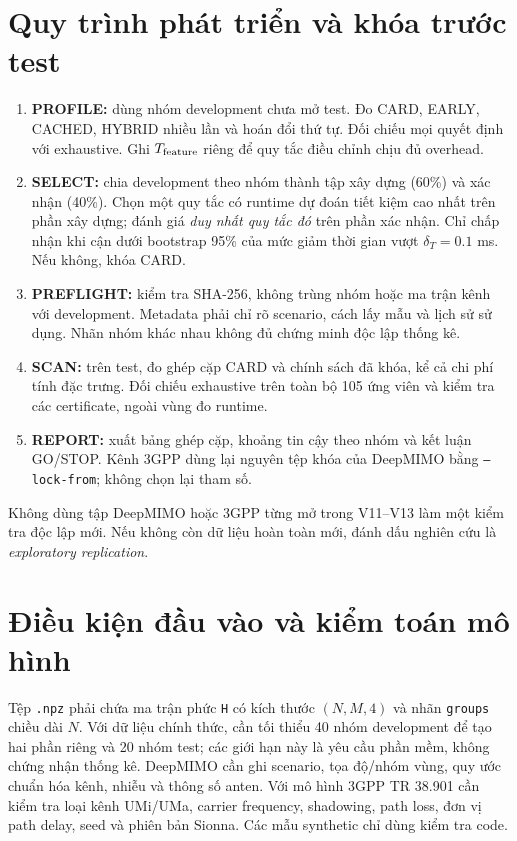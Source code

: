 \documentclass[11pt,onecolumn]{IEEEtran}
\begin{document}
\section{Quy trình phát triển và khóa trước test}
\begin{enumerate}
\item \textbf{PROFILE:} dùng nhóm development chưa mở test. Đo CARD, EARLY, CACHED, HYBRID nhiều lần và hoán đổi thứ tự. Đối chiếu mọi quyết định với exhaustive. Ghi $T_{\rm feature}$ riêng để quy tắc điều chỉnh chịu đủ overhead.
\item \textbf{SELECT:} chia development theo nhóm thành tập xây dựng (60\%) và xác nhận (40\%). Chọn một quy tắc có runtime dự đoán tiết kiệm cao nhất trên phần xây dựng; đánh giá \emph{duy nhất quy tắc đó} trên phần xác nhận. Chỉ chấp nhận khi cận dưới bootstrap 95\% của mức giảm thời gian vượt $\delta_T=0.1$ ms. Nếu không, khóa CARD.
\item \textbf{PREFLIGHT:} kiểm tra SHA-256, không trùng nhóm hoặc ma trận kênh với development. Metadata phải chỉ rõ scenario, cách lấy mẫu và lịch sử sử dụng. Nhãn nhóm khác nhau không đủ chứng minh độc lập thống kê.
\item \textbf{SCAN:} trên test, đo ghép cặp CARD và chính sách đã khóa, kể cả chi phí tính đặc trưng. Đối chiếu exhaustive trên toàn bộ 105 ứng viên và kiểm tra các certificate, ngoài vùng đo runtime.
\item \textbf{REPORT:} xuất bảng ghép cặp, khoảng tin cậy theo nhóm và kết luận GO/STOP. Kênh 3GPP dùng lại nguyên tệp khóa của DeepMIMO bằng \texttt{--lock-from}; không chọn lại tham số.
\end{enumerate}
Không dùng tập DeepMIMO hoặc 3GPP từng mở trong V11--V13 làm một kiểm tra độc lập mới. Nếu không còn dữ liệu hoàn toàn mới, đánh dấu nghiên cứu là \emph{exploratory replication}.

\section{Điều kiện đầu vào và kiểm toán mô hình}
Tệp \texttt{.npz} phải chứa ma trận phức \texttt{H} có kích thước $(N,M,4)$ và nhãn \texttt{groups} chiều dài $N$. Với dữ liệu chính thức, cần tối thiểu 40 nhóm development để tạo hai phần riêng và 20 nhóm test; các giới hạn này là yêu cầu phần mềm, không chứng nhận thống kê. DeepMIMO cần ghi scenario, tọa độ/nhóm vùng, quy ước chuẩn hóa kênh, nhiễu và thông số anten. Với mô hình 3GPP TR 38.901 cần kiểm tra loại kênh UMi/UMa, carrier frequency, shadowing, path loss, đơn vị path delay, seed và phiên bản Sionna. Các mẫu synthetic chỉ dùng kiểm tra code.
\end{document}
